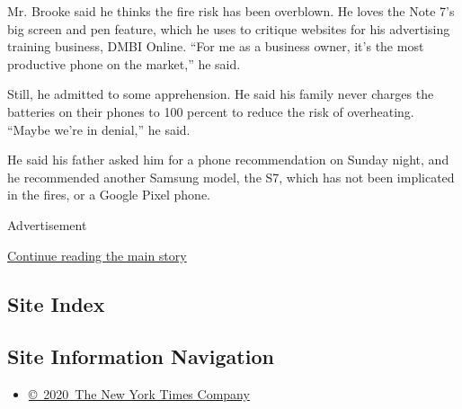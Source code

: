 Mr. Brooke said he thinks the fire risk has been overblown. He loves the
Note 7's big screen and pen feature, which he uses to critique websites
for his advertising training business, DMBI Online. ``For me as a
business owner, it's the most productive phone on the market,'' he said.

Still, he admitted to some apprehension. He said his family never
charges the batteries on their phones to 100 percent to reduce the risk
of overheating. ``Maybe we're in denial,'' he said.

He said his father asked him for a phone recommendation on Sunday night,
and he recommended another Samsung model, the S7, which has not been
implicated in the fires, or a Google Pixel phone.

Advertisement

\protect\hyperlink{after-bottom}{Continue reading the main story}

\hypertarget{site-index}{%
\subsection{Site Index}\label{site-index}}

\hypertarget{site-information-navigation}{%
\subsection{Site Information
Navigation}\label{site-information-navigation}}

\begin{itemize}
\tightlist
\item
  \href{https://help.nytimes3xbfgragh.onion/hc/en-us/articles/115014792127-Copyright-notice}{©~2020~The
  New York Times Company}
\end{itemize}

